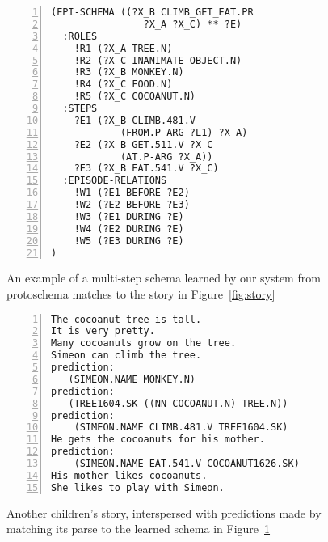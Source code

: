 \begin{figure}[htbp]
    \begin{lstlisting}[frame=single,numbers=left,numberstyle=\tiny,xleftmargin=1.5em,style=Schemas]
(EPI-SCHEMA ((?X_B CLIMB_GET_EAT.PR
                ?X_A ?X_C) ** ?E)
  :ROLES
    !R1 (?X_A TREE.N)
    !R2 (?X_C INANIMATE_OBJECT.N)
    !R3 (?X_B MONKEY.N)
    !R4 (?X_C FOOD.N)
    !R5 (?X_C COCOANUT.N)
  :STEPS
    ?E1 (?X_B CLIMB.481.V
            (FROM.P-ARG ?L1) ?X_A)
    ?E2 (?X_B GET.511.V ?X_C
            (AT.P-ARG ?X_A))
    ?E3 (?X_B EAT.541.V ?X_C)
  :EPISODE-RELATIONS
    !W1 (?E1 BEFORE ?E2)
    !W2 (?E2 BEFORE ?E3)
    !W3 (?E1 DURING ?E)
    !W4 (?E2 DURING ?E)
    !W5 (?E3 DURING ?E)
)\end{lstlisting}
    \caption{An example of a multi-step schema learned by our system from protoschema matches to the story in Figure~\ref{fig:story}}
    \label{fig:eg_schema}
\end{figure}


\begin{figure}[htbp]
    \begin{lstlisting}[frame=single,numbers=left,numberstyle=\tiny,xleftmargin=1.5em,style=Schemas2]
The cocoanut tree is tall.
It is very pretty.
Many cocoanuts grow on the tree.
Simeon can climb the tree.
prediction:
   (SIMEON.NAME MONKEY.N)
prediction:
   (TREE1604.SK ((NN COCOANUT.N) TREE.N))
prediction:
    (SIMEON.NAME CLIMB.481.V TREE1604.SK)
He gets the cocoanuts for his mother.
prediction:
    (SIMEON.NAME EAT.541.V COCOANUT1626.SK)
His mother likes cocoanuts.
She likes to play with Simeon.\end{lstlisting}
    \caption{Another children's story, interspersed with predictions made by matching its parse to the learned schema in Figure~\ref{fig:eg_schema}}
    \label{fig:predictions}
\end{figure}
\fi
